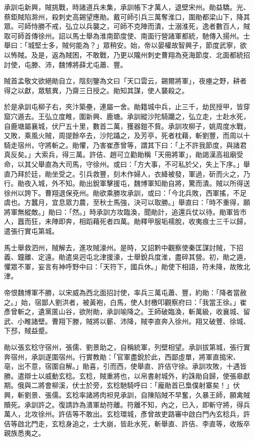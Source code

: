 \begin{pinyinscope}
 承訓屯新興，賊挑戰，時諸道兵未集，承訓帳下才萬人，退壁宋州。勛益驕。光、蔡鉅賊陷滁州，殺刺史高錫望應勛。戴可師引兵三萬奪淮口，圍勛都梁山下，降其眾。可師恃勝不戒，弘立以兵襲之，可師不克陣而潰，士溺淮死，逸者數百人，賊取可師首傳徐州。詔以馬士舉為淮南節度使、南面行營諸軍都統，馳傳入揚州。士舉曰：「城堅士多，賊何能為？」眾稍安。始，帝以晏權故智興子，節度武寧，欲以怖賊。及是，返為賊困，不敢戰，乃更以隴州刺史曹翔為兗海節度、北面都統招討使，屯滕、沛，魏博將薛尤屯蕭、豐。



 賊首孟敬文欲絕勛自立，陰刻鑒為文曰「天口雲云，錫爾將軍」，夜瘞之野，耕者得之以獻，眾駭異，乃齋三日授之。勛知其謀，使人襲殺之。



 於是承訓屯柳子右，夾汴築壘，連屬一舍。勛籍城中兵，止三千，劫民授甲，皆穿窟穴遁去。王弘立度睢，圍新興、鹿塘。承訓縱沙陀騎躪之，弘立走，士赴水死，自鹿塘屬襄城，伏尸五十里，數首二萬，獲器鎧不貲。承訓攻柳子，姚周度水戰，又敗，乘風火賊，周提餘卒去，沙陀躡之，及芳亭，死者枕藉，斬劉豐，而周以十騎走宿州，守將斬之。勛懼，乃害崔彥曾等，謂其下曰：「上不許我節度，與諸君真反矣。」大索兵，得三萬。許佶、趙可立勸勛稱「天冊將軍」，勛謁漢高祖廟受命，以其父舉直為大司馬，守徐州。或曰：「方大事，不可私於父，失上下序。」舉直乃拜於廷，勛坐受之。引兵救豐，刻木作婦人，衣絳被發，軍過，斫而火之，乃行。勛夜入城，外不知。勛出銳軍擊援屯，魏博軍知勛自將，驚而潰。賊以所得送徐州以誇下。曹翔退保兗州。勛欲乘勝攻承訓，或曰：「今北兵敗，西軍搖，不足虞也。方蠶月，宜息眾力農，至秋士馬強，決可以取勝。」舉直曰：「時不重得，願將軍無縱敵。」勛曰：「然。」時承訓方攻臨渙，聞勛計，追還兵仗以待。勛軍皆市人，囂而狂，未陣即奔，相蹈藉死者四萬。勛釋甲服垢襦脫，收夷痕士三千以歸，遣張行實屯第城。



 馬士舉救泗州，賊解去，進攻賊濠州。是時，又詔黔中觀察使秦匡謀討賊，下招義、鐘離、定遠。勛遣吳迥屯北津援濠，士舉銳兵度淮，盡碎其營。初，勛之遁，懼眾不軍，妄言有神呼野中曰：「天符下，國兵休。」勛使下相語，符未降，故敗北津。



 帝恨魏博軍不勝，以宋威為西北面招討使，率兵三萬屯蕭、豐，約勛：「降者當赦之。」始，宿鄙人劉洪者，被黃袍，白馬，使人封檄叩觀察府曰：「我當王徐。」崔彥曾斬之，遺黨匿山谷，欲附勛，承訓喻降之。王師破臨渙，斬萬級，收襄城、留武、小睢諸壁。曹翔下滕，賊將以蘄、沛降，賊李直奔入徐州。翔又破豐、徐城、下邳，賊益蹙。



 勛以張玄稔守宿州，張儒、劉景助之，自稱統軍，列壁相望。承訓拔第城，張行實奔宿州，承訓遂圍宿州。行實教勛：「官軍盡銳於此，西鄙虛單，將軍直搗宋、亳，出不意，宿圍自解。」勛喜，引而西，使舉直、許佶守徐。承訓攻敗，十遇皆勝。遣辯士以威動玄稔。玄稔，賊重將也，以帛書射城外，約誅勛自歸，使張皋獻期。俄與二將會柳溪，伏士於旁，玄稔馳騎呼曰：「龐勛首已梟僕射寨矣！」伏興，斬劉景、張儒。玄稔率諸將肉袒見承訓，自陳陷賊不早奮，久暴王師，願禽賊贖死。承訓許之。復請詐為潰軍劫符離。符離不知，內之，已入，即斬守將，得兵萬人，北攻徐州。許佶等不敢出。玄稔環城，彥曾故吏路審中啟白門內玄稔兵，許佶等啟北門走，玄稔身追之，士大崩，皆赴水死，斬舉直、許佶、李直等，收叛卒親族悉夷之。




\end{pinyinscope}
